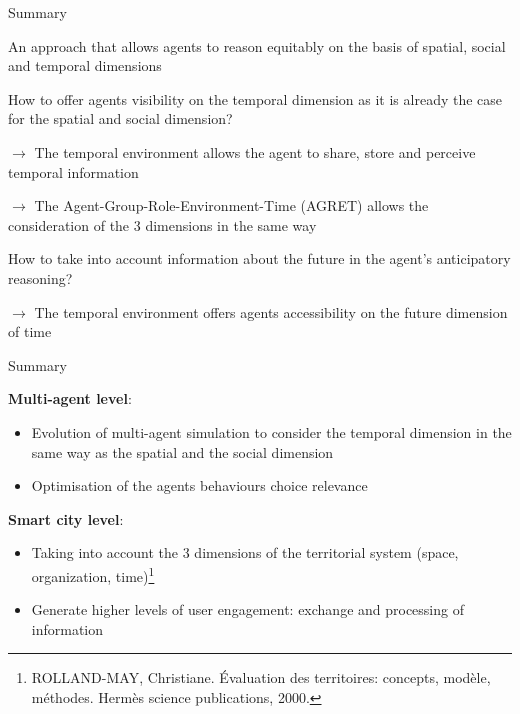\begin{frame}{Summary}
\par An approach that allows agents to reason equitably on the basis of spatial, social and temporal dimensions
\vspace{.4cm}
\par How to offer agents visibility on the temporal dimension as it is already the case for the spatial and social dimension?
\par \alert{$\rightarrow$ The temporal environment} allows the agent to share, store and perceive temporal information
\par \alert{$\rightarrow$ The Agent-Group-Role-Environment-Time (AGRET)} allows the consideration of the 3 dimensions in the same way
\medbreak
\par How to take into account information about the future in the agent's anticipatory reasoning?
\par \alert{$\rightarrow$ The temporal environment} offers agents accessibility on the future dimension of time
\vspace{.4cm}
\end{frame}

\begin{frame}{Summary}
\par \textbf{Multi-agent level}: 
\begin{itemize}
    \item Evolution of multi-agent simulation to  consider the temporal dimension in the same way as the spatial and the social dimension
    \item Optimisation of the agents behaviours choice relevance
\end{itemize} 
\medbreak
\par \textbf{Smart city level}: 
\begin{itemize}
    \item Taking into account the 3 dimensions of the territorial system (space, organization, time)\footnote{ROLLAND-MAY, Christiane. Évaluation des territoires: concepts, modèle, méthodes. Hermès science publications, 2000.}
    \item Generate higher levels of user engagement: exchange and processing of information 
\end{itemize}
    
\end{frame}

